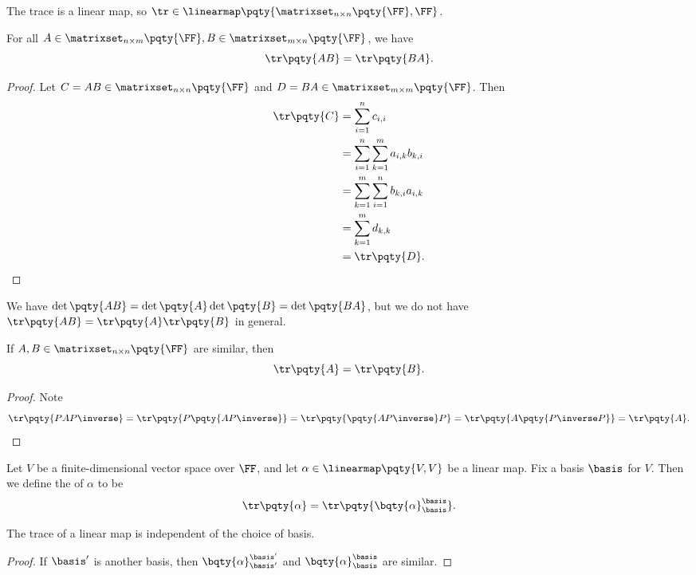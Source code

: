 \begin{remark}
    The trace is a linear map, so \(\tr \in \linearmap\pqty{\matrixset_{n \times n} \pqty{\FF}, \FF}\).
\end{remark}

\begin{lemma}
    For all \(A \in \matrixset_{n \times m} \pqty{\FF}, B \in \matrixset_{m \times n} \pqty{\FF}\), we have
    \[
        \tr\pqty{AB} = \tr\pqty{BA}.
    \]
\end{lemma}

\begin{proof}
    Let \(C = AB \in \matrixset_{n \times n} \pqty{\FF}\) and \(D = BA \in \matrixset_{m \times m} \pqty{\FF}\). Then
    \begin{align*}
        \tr\pqty{C} &= \sum_{i = 1}^{n} c_{i, i} \\
        &= \sum_{i = 1}^{n} \sum_{k = 1}^{m} a_{i, k} b_{k, i} \\
        &= \sum_{k = 1}^{m} \sum_{i = 1}^{n} b_{k, i} a_{i, k} \\
        &= \sum_{k = 1}^{m} d_{k, k} \\
        &= \tr\pqty{D}.
    \end{align*}
\end{proof}

\begin{remark}
    We have \(\det\pqty{AB} = \det\pqty{A} \det\pqty{B} = \det\pqty{BA}\), but we do not have \(\tr\pqty{AB} = \tr\pqty{A} \tr\pqty{B}\) in general.
\end{remark}

\begin{corollary}
    If \(A, B \in \matrixset_{n \times n} \pqty{\FF}\) are similar, then
    \[
        \tr\pqty{A} = \tr\pqty{B}.
    \]
\end{corollary}

\begin{proof}
    Note
    \[
        \tr\pqty{P A P\inverse} = \tr\pqty{P \pqty{A P\inverse}} = \tr\pqty{\pqty{A P\inverse} P} = \tr\pqty{A \pqty{P\inverse P}} = \tr\pqty{A}.
    \]
\end{proof}

\begin{definition}
    Let \(V\) be a finite-dimensional vector space over \(\FF\), and let \(\alpha \in \linearmap\pqty{V, V}\) be a linear map. Fix a basis \(\basis\) for \(V\). Then we define the  of \(\alpha\) to be
    \[
        \tr\pqty{\alpha} = \tr\pqty{\bqty{\alpha}_{\basis}^{\basis}}.
    \]
\end{definition}

\begin{proposition}
    The trace of a linear map is independent of the choice of basis.
\end{proposition}

\begin{proof}
    If \(\basis'\) is another basis, then \(\bqty{\alpha}_{\basis'}^{\basis'}\) and \(\bqty{\alpha}_{\basis}^{\basis}\) are similar.
\end{proof}